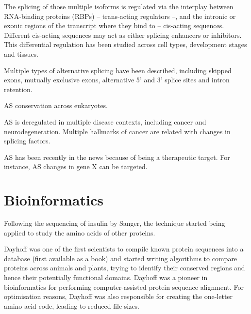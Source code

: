 The splicing of those multiple isoforms is regulated via the interplay between RNA-binding proteins (RBPs) -- trans-acting regulators --, and the intronic or exonic regions of the transcript where they bind to -- cis-acting sequences. Different cis-acting sequences may act as either splicing enhancers or inhibitors. This differential regulation has been studied across cell types, development stages and tissues.


Multiple types of alternative splicing have been described, including skipped exons, mutually exclusive exons, alternative 5' and 3' splice sites and intron retention.


AS conservation across eukaryotes.

AS is deregulated in multiple disease contexts, including cancer and neurodegeneration. Multiple hallmarks of cancer are related with changes in splicing factors.


AS has been recently in the news because of being a therapeutic target. For instance, AS changes in gene X can be targeted. %

\section{Bioinformatics}

Following the sequencing of insulin by Sanger, the technique started being applied to study the amino acids of other proteins.


Dayhoff was one of the first scientists to compile known protein sequences into a database (first available as a book) and started writing algorithms to compare proteins across animals and plants, trying to identify their conserved regions and hence their potentially functional domains. Dayhoff was a pioneer in bioinformatics for performing computer-assisted protein sequence alignment. For optimisation reasons, Dayhoff was also responsible for creating the one-letter amino acid code, leading to reduced file sizes.

